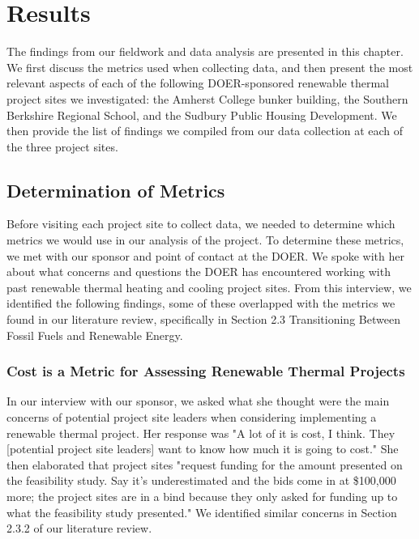 
\chapter{Results}
\par The findings from our fieldwork and data analysis are presented in this chapter. We first discuss the metrics used when collecting data, and then present the most relevant aspects of each of the following DOER-sponsored renewable thermal project sites we investigated: the Amherst College bunker building, the Southern Berkshire Regional School, and the Sudbury Public Housing Development. We then provide the list of findings we compiled from our data collection at each of the three project sites.

\section{Determination of Metrics}
\par Before visiting each project site to collect data, we needed to determine which metrics we would use in our analysis of the project. To determine these metrics, we met with our sponsor and point of contact at the DOER. We spoke with her about what concerns and questions the DOER has encountered working with past renewable thermal heating and cooling project sites. From this interview, we identified the following findings, some of these overlapped with the metrics we found in our literature review, specifically in Section 2.3 Transitioning Between Fossil Fuels and Renewable Energy.

\subsection{Cost is a Metric for Assessing Renewable Thermal Projects}
\par In our interview with our sponsor, we asked what she thought were the main concerns of potential project site leaders when considering implementing a renewable thermal project. Her response was "A lot of it is cost, I think. They [potential project site leaders] want to know how much it is going to cost." She then elaborated that project sites "request funding for the amount presented on the feasibility study. Say it’s underestimated and the bids come in at \$100,000 more; the project sites are in a bind because they only asked for funding up to what the feasibility study presented." We identified similar concerns in Section 2.3.2 of our literature review.

